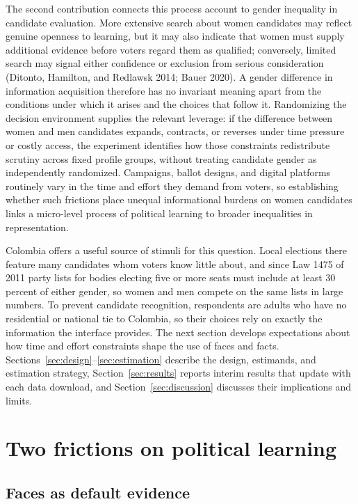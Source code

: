 \documentclass[11pt]{article}\usepackage[]{graphicx}\usepackage[]{xcolor}
\begin{document}
The second contribution connects this process account to gender inequality in candidate evaluation. More extensive search about women candidates may reflect genuine openness to learning, but it may also indicate that women must supply additional evidence before voters regard them as qualified; conversely, limited search may signal either confidence or exclusion from serious consideration (Ditonto, Hamilton, and Redlawsk 2014; Bauer 2020). A gender difference in information acquisition therefore has no invariant meaning apart from the conditions under which it arises and the choices that follow it. Randomizing the decision environment supplies the relevant leverage: if the difference between women and men candidates expands, contracts, or reverses under time pressure or costly access, the experiment identifies how those constraints redistribute scrutiny across fixed profile groups, without treating candidate gender as independently randomized. Campaigns, ballot designs, and digital platforms routinely vary in the time and effort they demand from voters, so establishing whether such frictions place unequal informational burdens on women candidates links a micro-level process of political learning to broader inequalities in representation.

Colombia offers a useful source of stimuli for this question. Local elections there feature many candidates whom voters know little about, and since Law 1475 of 2011 party lists for bodies electing five or more seats must include at least 30 percent of either gender, so women and men compete on the same lists in large numbers. To prevent candidate recognition, respondents are adults who have no residential or national tie to Colombia, so their choices rely on exactly the information the interface provides. The next section develops expectations about how time and effort constraints shape the use of faces and facts. Sections~\ref{sec:design}--\ref{sec:estimation} describe the design, estimands, and estimation strategy, Section~\ref{sec:results} reports interim results that update with each data download, and Section~\ref{sec:discussion} discusses their implications and limits.

\section{Two frictions on political learning}
\label{sec:theory}

\subsection{Faces as default evidence}
\end{document}
